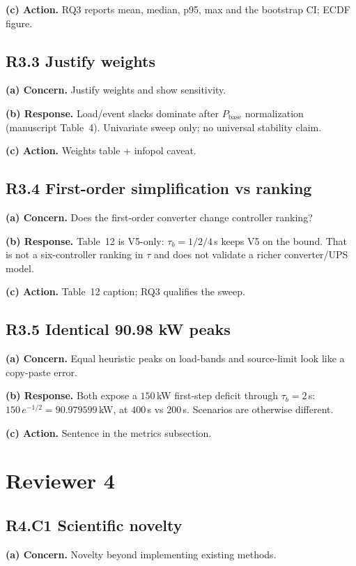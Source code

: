 \documentclass[11pt]{article}
\begin{document}
\textbf{(c) Action.} RQ3 reports mean, median, p95, max and the bootstrap CI; ECDF figure.

\subsection*{R3.3 Justify weights}
\textbf{(a) Concern.} Justify weights and show sensitivity.

\textbf{(b) Response.} Load/event slacks dominate after $P_{\mathrm{base}}$ normalization (manuscript Table~4). Univariate sweep only; no universal stability claim.

\textbf{(c) Action.} Weights table + infopol caveat.

\subsection*{R3.4 First-order simplification vs ranking}
\textbf{(a) Concern.} Does the first-order converter change controller ranking?

\textbf{(b) Response.} Table~12 is V5-only: $\tau_b=1/2/4$\,s keeps V5 on the bound. That is not a six-controller ranking in $\tau$ and does not validate a richer converter/UPS model.

\textbf{(c) Action.} Table~12 caption; RQ3 qualifies the sweep.

\subsection*{R3.5 Identical 90.98 kW peaks}
\textbf{(a) Concern.} Equal heuristic peaks on load-bands and source-limit look like a copy-paste error.

\textbf{(b) Response.} Both expose a $150$\,kW first-step deficit through $\tau_b=2$\,s: $150\,e^{-1/2}=90.979599$\,kW, at $400$\,s vs $200$\,s. Scenarios are otherwise different.

\textbf{(c) Action.} Sentence in the metrics subsection.

\section*{Reviewer 4}

\subsection*{R4.C1 Scientific novelty}
\textbf{(a) Concern.} Novelty beyond implementing existing methods.
\end{document}
